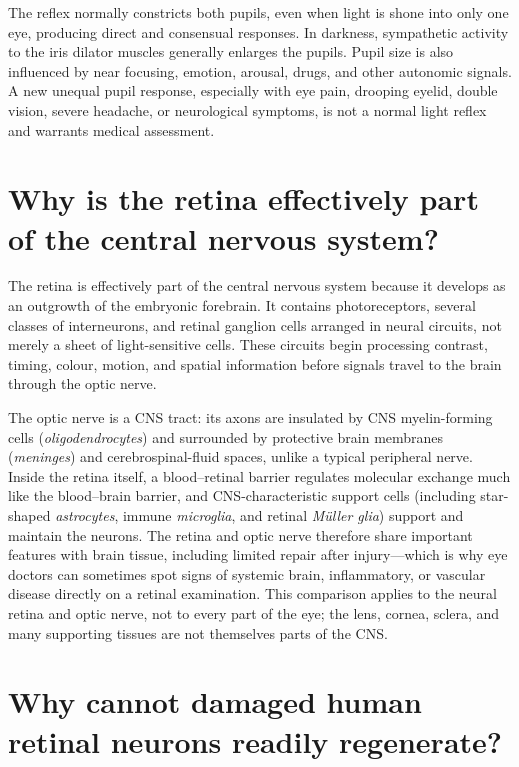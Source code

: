 \documentclass[11pt,oneside]{report}
\begin{document}
The reflex normally constricts both pupils, even when light is shone into only
one eye, producing direct and consensual responses. In darkness, sympathetic
activity to the iris dilator muscles generally enlarges the pupils. Pupil size
is also influenced by near focusing, emotion, arousal, drugs, and other
autonomic signals. A new unequal pupil response, especially with eye pain,
drooping eyelid, double vision, severe headache, or neurological symptoms, is
not a normal light reflex and warrants medical assessment.

\section{Why is the retina effectively part of the central nervous system?}

The retina is effectively part of the central nervous system because it develops
as an outgrowth of the embryonic forebrain. It contains photoreceptors, several
classes of interneurons, and retinal ganglion cells arranged in neural circuits,
not merely a sheet of light-sensitive cells. These circuits begin processing
contrast, timing, colour, motion, and spatial information before signals travel
to the brain through the optic nerve.

The optic nerve is a CNS tract: its axons are insulated by CNS myelin-forming
cells (\emph{oligodendrocytes}) and surrounded by protective brain membranes
(\emph{meninges}) and cerebrospinal-fluid spaces, unlike a typical peripheral
nerve. Inside the retina itself, a blood--retinal barrier regulates molecular
exchange much like the blood--brain barrier, and CNS-characteristic support
cells (including star-shaped \emph{astrocytes}, immune \emph{microglia}, and
retinal \emph{M\"uller glia}) support and maintain the neurons. The retina and
optic nerve therefore share important features with brain tissue, including
limited repair after injury—which is why eye doctors can sometimes spot signs
of systemic brain, inflammatory, or vascular disease directly on a retinal
examination. This comparison applies to the neural retina and optic nerve, not to
every part of the eye; the lens, cornea, sclera, and many supporting tissues
are not themselves parts of the CNS.

\section{Why cannot damaged human retinal neurons readily regenerate?}
\end{document}
